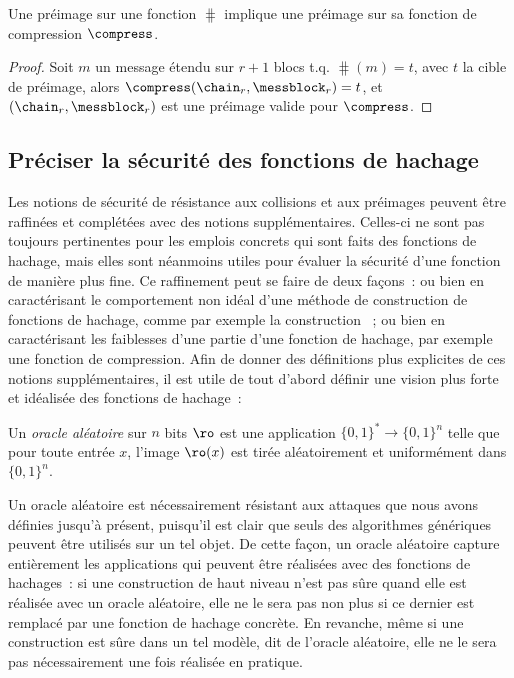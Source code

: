 \begin{prop}
Une préimage sur une fonction \merkdam $\hash$ implique une préimage sur sa fonction de compression
$\compress$.
\end{prop}
\begin{proof}
Soit
$m$ un message étendu sur  $r+1$ blocs t.q. $\hash(m) = t$, avec $t$ la cible de préimage, alors
$\compress(\chain_r, \messblock_r) = t$, et $(\chain_r, \messblock_r)$ est une préimage valide pour $\compress$.
\end{proof}

\subsection{Préciser la sécurité des fonctions de hachage\label{sec:frefmd}}

Les notions de sécurité de résistance aux collisions et aux préimages peuvent être raffinées et complétées avec des notions supplémentaires.
Celles-ci ne sont pas toujours pertinentes pour les emplois concrets qui sont faits des fonctions de hachage, mais elles sont néanmoins
utiles pour évaluer la sécurité d'une fonction de manière plus fine.
Ce raffinement peut se faire de deux façons~: ou bien en caractérisant le comportement
non idéal d'une méthode de construction de fonctions de hachage, comme par exemple la construction \merkdam~; ou bien en caractérisant
les faiblesses d'une partie d'une fonction de hachage, par exemple une fonction de compression.
Afin de donner des définitions plus explicites de ces notions supplémentaires, il est utile de tout d'abord définir une vision plus forte et idéalisée des
fonctions de hachage~:

\begin{fdefi}
Un \emph{oracle aléatoire} sur $n$ bits
$\ro$ est une application $\{0,1\}^* \rightarrow \{0,1\}^n$ telle que pour toute entrée $x$,
l'image $\ro(x)$ est tirée aléatoirement et uniformément dans $\{0,1\}^n$.
\end{fdefi}

Un oracle aléatoire est nécessairement résistant aux attaques que nous avons définies jusqu'à présent, puisqu'il est clair
que seuls des algorithmes génériques peuvent être utilisés sur un tel objet. De cette façon, un oracle aléatoire capture
entièrement les applications qui peuvent être réalisées avec des fonctions de hachages~: si une construction de haut niveau
n'est pas sûre quand elle est réalisée avec un oracle aléatoire, elle ne le sera pas non plus si ce dernier est remplacé par une fonction
de hachage concrète. En revanche, même si une construction est sûre dans un tel modèle, dit de l'oracle aléatoire, elle ne le sera
pas nécessairement
une fois réalisée en pratique.


